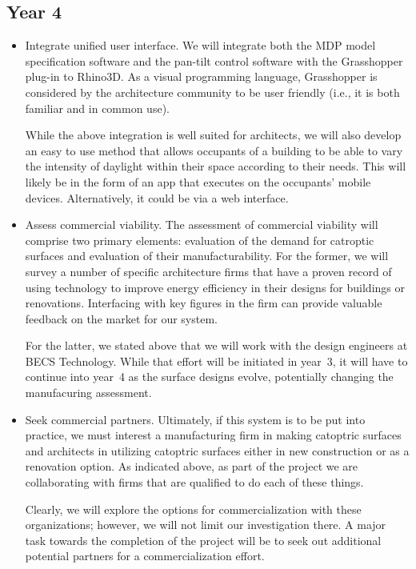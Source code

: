 \documentclass[11pt]{article}
\begin{document}
\subsection*{Year 4}

\begin{itemize}

\item Integrate unified user interface.
We will integrate both the MDP model specification software and the
pan-tilt control software with the Grasshopper plug-in to Rhino3D.
As a visual programming language, Grasshopper is considered by
the architecture community to be user friendly (i.e., it is both familiar
and in common use).

While the above integration is well suited for architects, we will also
develop an easy to use method that allows occupants of a building to
be able to vary the intensity of daylight within their space according
to their needs. This will likely be in the form of an app that executes
on the occupants' mobile devices. Alternatively, it could be via a web
interface.

\item Assess commercial viability.
The assessment of commercial viability will comprise two primary elements:
evaluation of the demand for catroptic surfaces and evaluation of their
manufacturability.  For the former, we will survey a number of specific
architecture firms that have a proven record of using technology to
improve energy efficiency in their designs for buildings or renovations.
Interfacing with key figures in the firm can provide valuable feedback on
the market for our system.

For the latter, we stated above that we will work with the design engineers
at BECS Technology.  While that effort will be initiated in year~3, it will
have to continue into year~4 as the surface designs evolve, potentially
changing the manufacuring assessment.

\item Seek commercial partners.
Ultimately, if this system is to be put into practice, we must interest
a manufacturing firm in making catoptric surfaces and architects in utilizing
catoptric surfaces either in new construction or as a renovation option.
As indicated above, as part of the project
we are collaborating with firms that are qualified to
do each of these things.

Clearly, we will explore the options for commercialization with these
organizations; however, we will not limit our investigation there.  A major
task towards the completion of the project will be to seek out additional
potential partners for a commercialization effort.

\end{itemize}
\end{document}
